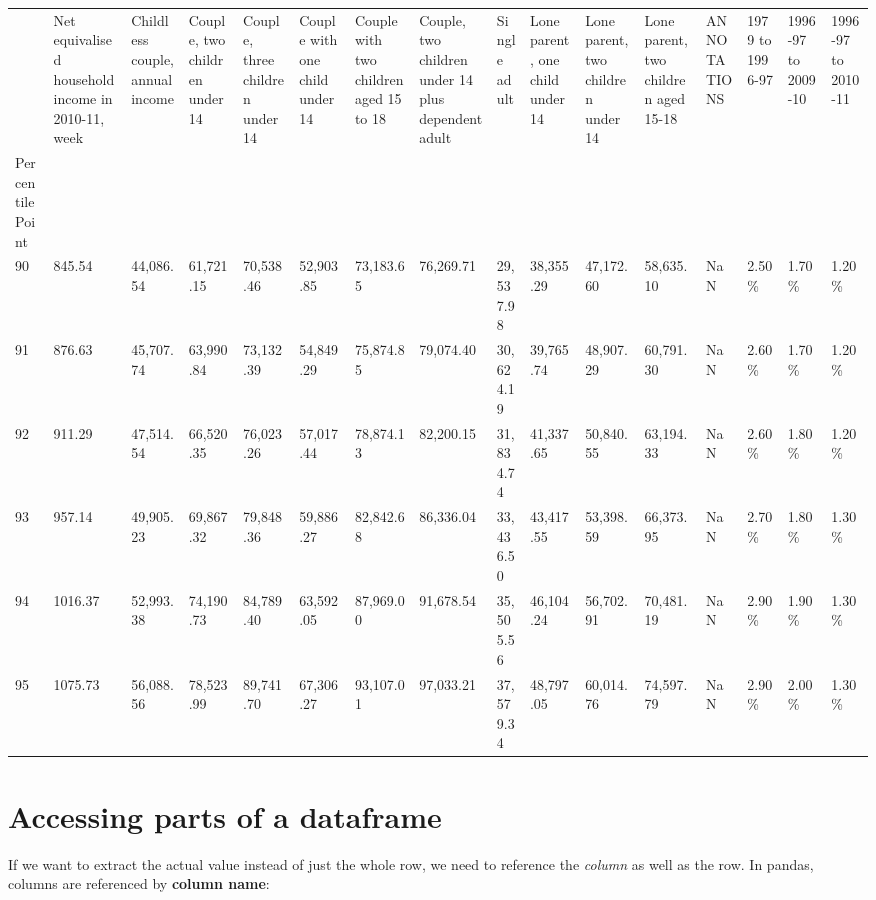 \documentclass[
  letterpaper,
  DIV=11,
  numbers=noendperiod]{scrreprt}
\begin{document}
\begin{longtable}[]{@{}llllllllllllllll@{}}
\toprule()
& Net equivalised household income in 2010-11, week & Childless couple,
annual income & Couple, two children under 14 & Couple, three children
under 14 & Couple with one child under 14 & Couple with two children
aged 15 to 18 & Couple, two children under 14 plus dependent adult &
Single adult & Lone parent, one child under 14 & Lone parent, two
children under 14 & Lone parent, two children aged 15-18 & ANNOTATIONS &
1979 to 1996-97 & 1996-97 to 2009-10 & 1996-97 to 2010-11 \\
Percentile Point & & & & & & & & & & & & & & & \\
\midrule()
\endhead
90 & 845.54 & 44,086.54 & 61,721.15 & 70,538.46 & 52,903.85 & 73,183.65
& 76,269.71 & 29,537.98 & 38,355.29 & 47,172.60 & 58,635.10 & NaN &
2.50\% & 1.70\% & 1.20\% \\
91 & 876.63 & 45,707.74 & 63,990.84 & 73,132.39 & 54,849.29 & 75,874.85
& 79,074.40 & 30,624.19 & 39,765.74 & 48,907.29 & 60,791.30 & NaN &
2.60\% & 1.70\% & 1.20\% \\
92 & 911.29 & 47,514.54 & 66,520.35 & 76,023.26 & 57,017.44 & 78,874.13
& 82,200.15 & 31,834.74 & 41,337.65 & 50,840.55 & 63,194.33 & NaN &
2.60\% & 1.80\% & 1.20\% \\
93 & 957.14 & 49,905.23 & 69,867.32 & 79,848.36 & 59,886.27 & 82,842.68
& 86,336.04 & 33,436.50 & 43,417.55 & 53,398.59 & 66,373.95 & NaN &
2.70\% & 1.80\% & 1.30\% \\
94 & 1016.37 & 52,993.38 & 74,190.73 & 84,789.40 & 63,592.05 & 87,969.00
& 91,678.54 & 35,505.56 & 46,104.24 & 56,702.91 & 70,481.19 & NaN &
2.90\% & 1.90\% & 1.30\% \\
95 & 1075.73 & 56,088.56 & 78,523.99 & 89,741.70 & 67,306.27 & 93,107.01
& 97,033.21 & 37,579.34 & 48,797.05 & 60,014.76 & 74,597.79 & NaN &
2.90\% & 2.00\% & 1.30\% \\
\bottomrule()
\end{longtable}

\hypertarget{accessing-parts-of-a-dataframe}{%
\section{Accessing parts of a
dataframe}\label{accessing-parts-of-a-dataframe}}

If we want to extract the actual value instead of just the whole row, we
need to reference the \emph{column} as well as the row. In pandas,
columns are referenced by \textbf{column name}:
\end{document}
